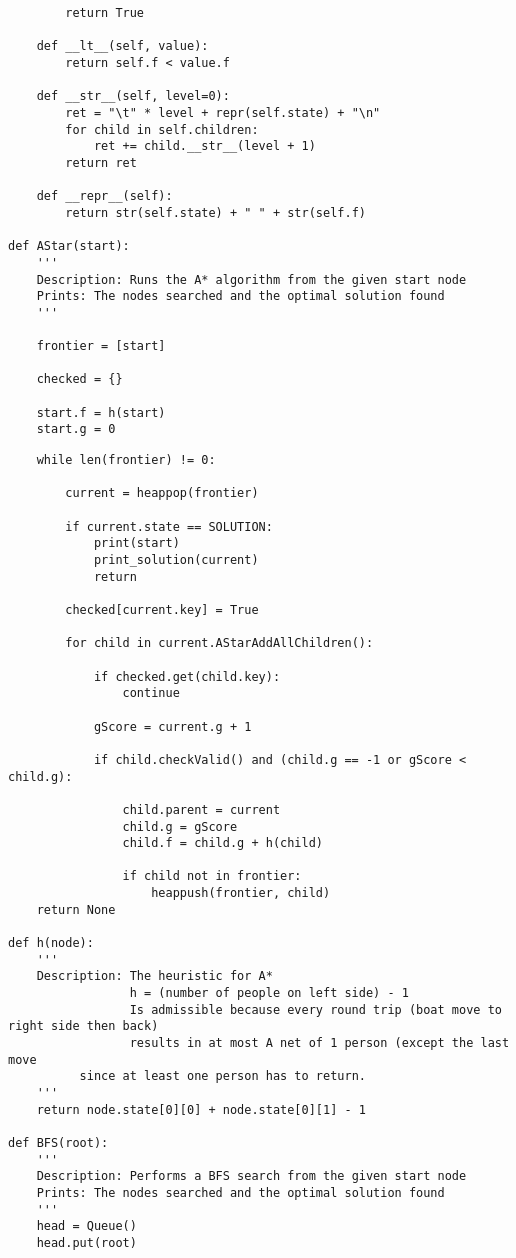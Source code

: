 \documentclass{article}
\begin{document}
\begin{verbatim}
        return True

    def __lt__(self, value):
        return self.f < value.f

    def __str__(self, level=0):
        ret = "\t" * level + repr(self.state) + "\n"
        for child in self.children:
            ret += child.__str__(level + 1)
        return ret

    def __repr__(self):
        return str(self.state) + " " + str(self.f)

def AStar(start):
    '''
    Description: Runs the A* algorithm from the given start node
    Prints: The nodes searched and the optimal solution found
    '''

    frontier = [start]

    checked = {}

    start.f = h(start)
    start.g = 0
\end{verbatim}
\newpage
\begin{verbatim}
    while len(frontier) != 0:

        current = heappop(frontier)

        if current.state == SOLUTION:
            print(start)
            print_solution(current)
            return

        checked[current.key] = True

        for child in current.AStarAddAllChildren():

            if checked.get(child.key):
                continue

            gScore = current.g + 1

            if child.checkValid() and (child.g == -1 or gScore < child.g):

                child.parent = current
                child.g = gScore
                child.f = child.g + h(child)

                if child not in frontier:
                    heappush(frontier, child)
    return None

def h(node):
    '''
    Description: The heuristic for A*
                 h = (number of people on left side) - 1
                 Is admissible because every round trip (boat move to right side then back)
                 results in at most A net of 1 person (except the last move 
	      since at least one person has to return.
    '''
    return node.state[0][0] + node.state[0][1] - 1

def BFS(root):
    '''
    Description: Performs a BFS search from the given start node
    Prints: The nodes searched and the optimal solution found
    '''
    head = Queue()
    head.put(root)
\end{verbatim}
\end{document}
